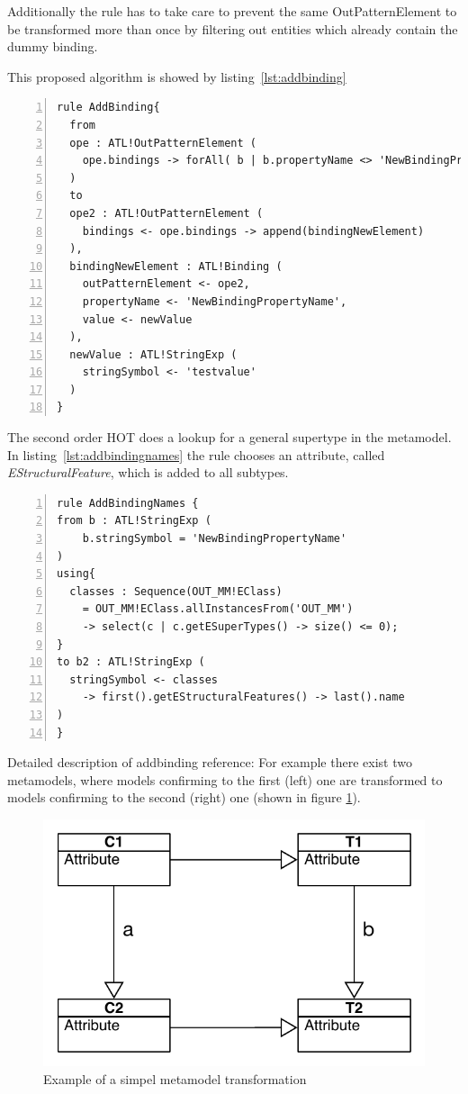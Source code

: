 \documentclass{llncs}
\begin{document}
Additionally the rule has to take care to prevent the same OutPatternElement to be transformed more than once by filtering out entities which already contain the dummy binding.

This proposed algorithm is showed by listing~\ref{lst:addbinding}

\begin{lstlisting}[language=ATL, numbers=left,xleftmargin=5.0ex, caption=AddBinding-Definition, label=lst:addbinding]
rule AddBinding{
  from 
  ope : ATL!OutPatternElement ( 
    ope.bindings -> forAll( b | b.propertyName <> 'NewBindingPropertyName')
  )
  to
  ope2 : ATL!OutPatternElement (
    bindings <- ope.bindings -> append(bindingNewElement)
  ), 
  bindingNewElement : ATL!Binding (
    outPatternElement <- ope2,
    propertyName <- 'NewBindingPropertyName',
    value <- newValue	
  ),
  newValue : ATL!StringExp (
    stringSymbol <- 'testvalue'
  )	
}
\end{lstlisting}

The second order HOT does a lookup for a general supertype in the metamodel. In listing~\ref{lst:addbindingnames} the rule chooses an attribute, called \emph{EStructuralFeature}, which is added to all subtypes.

\begin{lstlisting}[language=ATL, numbers=left,xleftmargin=5.0ex, caption=AddBindingNames-Definition., label=lst:addbindingnames]
rule AddBindingNames {
from b : ATL!StringExp (
    b.stringSymbol = 'NewBindingPropertyName'
)
using{
  classes : Sequence(OUT_MM!EClass) 
	= OUT_MM!EClass.allInstancesFrom('OUT_MM') 
	-> select(c | c.getESuperTypes() -> size() <= 0);
}
to b2 : ATL!StringExp ( 
  stringSymbol <- classes 
	-> first().getEStructuralFeatures() -> last().name
)	
}
\end{lstlisting}

Detailed description of addbinding reference:
For example there exist two metamodels, where models confirming to the first (left) one are transformed to models confirming to the second (right) one (shown in figure
\ref{fig:simple_metamodel}).

\begin{figure}
	\centering
	\includegraphics[angle=0,width=1\textwidth,natwidth=610,natheight=642]{figures/SimpleMM.pdf}
	\caption{Example of a simpel metamodel transformation}
	\label{fig:simple_metamodel}
\end{figure}
\end{document}
